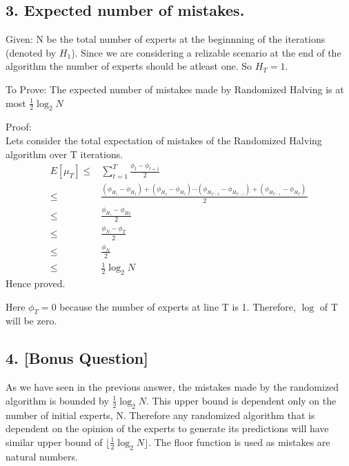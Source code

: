 \documentclass{article}
\begin{document}
\subsection*{3. Expected number of mistakes.}
\begin{description}
  \item{Given:} N be the total number of experts at the beginnning of the iterations (denoted by \( H_{1} \)). Since we are considering a relizable scenario at the end of the algorithm the number of experts should be atleast one.  So \( H_{T} = 1 \). 
  \item{To Prove:} The expected number of mistakes made by Randomized Halving is at most \( \frac{1}{2}\log_2{N} \)
  \item{Proof:} \\
    Lets consider the total expectation of mistakes of the Randomized Halving algorithm over T iterations.
    \begin{align*}
      E[\mu_{T}] \le & \sum_{t=1}^{T} \frac{\phi_{t} - \phi_{t+1}}{2} \\
      \le & \frac{(\phi_{H_{1}} - \phi_{H_{2}}) + (\phi_{H_{2}} - \phi_{H_{3}})  \cdots (\phi_{H_{T-2}} - \phi_{H_{T-1}}) + (\phi_{H_{T-1}} - \phi_{H_{T}}) \ }{2} \\
      \le & \frac{\phi_{H_{1}} - \phi_{H_{T}}}{2} \\
      \le & \frac{\phi_{N} - \phi_{T}}{2} \\
      \le & \frac{\phi_{N}}{2} \\
      \le & \frac{1}{2}\log_2{N}
    \end{align*}
    Hence proved.

    Here \( \phi_{T} = 0 \) because the number of experts at line T is 1.  Therefore, \( \log \) of T will be zero.
\end{description}

\subsection*{4. [Bonus Question]}
As we have seen in the previous answer, the mistakes made by the randomized algorithm is bounded by \( \frac{1}{2}\log_2{N} \).  This upper bound is dependent only on the number of initial experts, N.  Therefore any randomized algorithm that is dependent on the opinion of the experts to generate its predictions will have similar upper bound of \( \lfloor \frac{1}{2}\log_2{N} \rfloor \).  The floor function is used as mistakes are natural numbers.
\end{document}
